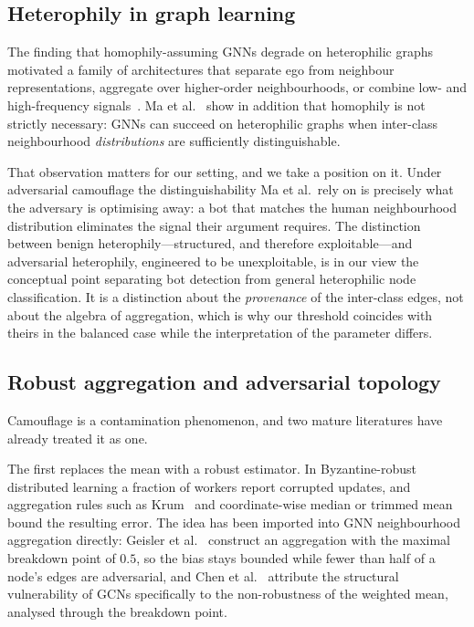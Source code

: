 \documentclass[onecolumn,pdflatex,sn-basic,Numbered]{sn-jnl}
\theoremstyle{thmstyleone}
\theoremstyle{thmstylethree}
\begin{document}
\subsection{Heterophily in graph learning}

The finding that homophily-assuming GNNs degrade on heterophilic graphs motivated a
family of architectures that separate ego from neighbour representations, aggregate
over higher-order neighbourhoods, or combine low- and high-frequency
signals~\citep{zhu2020beyond,luan2022revisiting}. Ma et al.~\citep{ma2022homophily}
show in addition that homophily is not strictly necessary: GNNs can succeed on
heterophilic graphs when inter-class neighbourhood \emph{distributions} are
sufficiently distinguishable.

That observation matters for our setting, and we take a position on it. Under
adversarial camouflage the distinguishability Ma et al.\ rely on is precisely what
the adversary is optimising away: a bot that matches the human neighbourhood
distribution eliminates the signal their argument requires. The distinction between
benign heterophily---structured, and therefore exploitable---and adversarial
heterophily, engineered to be unexploitable, is in our view the conceptual point
separating bot detection from general heterophilic node classification. It is a
distinction about the \emph{provenance} of the inter-class edges, not about the
algebra of aggregation, which is why our threshold coincides with theirs in the
balanced case while the interpretation of the parameter differs.

\subsection{Robust aggregation and adversarial topology}
\label{sec:related-robust}

Camouflage is a contamination phenomenon, and two mature literatures have already
treated it as one.

The first replaces the mean with a robust estimator. In Byzantine-robust distributed
learning a fraction of workers report corrupted updates, and aggregation rules such
as Krum~\citep{blanchard2017machine} and coordinate-wise median or trimmed
mean~\citep{yin2018byzantine} bound the resulting error. The idea has been imported
into GNN neighbourhood aggregation directly: Geisler
et al.~\citep{geisler2020reliable} construct an aggregation with the maximal
breakdown point of $0.5$, so the bias stays bounded while fewer than half of a
node's edges are adversarial, and Chen et al.~\citep{chen2021understanding} attribute
the structural vulnerability of GCNs specifically to the non-robustness of the
weighted mean, analysed through the breakdown point.
\end{document}
